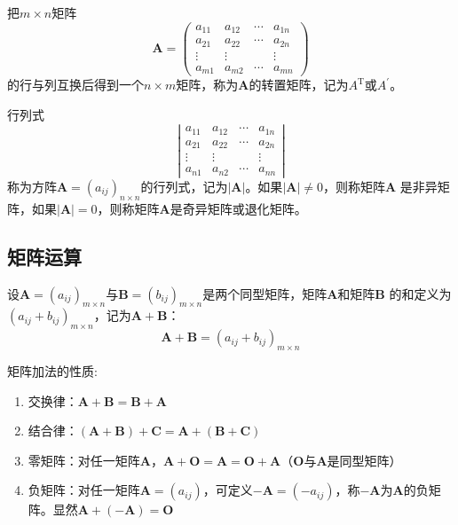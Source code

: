 \begin{definition}[转置矩阵]
    把$m\times n$矩阵
    $$
    \boldsymbol{A}=\left(\begin{array}{cccc}
    a_{11} & a_{12} & \cdots & a_{1 n} \\
    a_{21} & a_{22} & \cdots & a_{2 n} \\
    \vdots & \vdots & & \vdots \\
    a_{m 1} & a_{m 2} & \cdots & a_{m n}
    \end{array}\right)
    $$
    的行与列互换后得到一个$n\times m$矩阵，称为$\boldsymbol{A}$的{\heiti 转置矩阵}，记为$A^\mathrm{T}$或$A^{\prime}$。
\end{definition}

\begin{definition}[方阵的行列式]
    行列式
    $$
    \left|\begin{array}{cccc}
    a_{11} & a_{12} & \cdots & a_{1 n} \\
    a_{21} & a_{22} & \cdots & a_{2 n} \\
    \vdots & \vdots & & \vdots \\
    a_{n 1} & a_{n 2} & \cdots & a_{n n}
    \end{array}\right|
    $$
    称为方阵$\boldsymbol{A}=(a_{ij})_{n\times n}$的行列式，记为$|\boldsymbol{A}|$。如果$|\boldsymbol{A}|\neq 0$，则称矩阵$\boldsymbol{A}$
    是{\heiti 非异矩阵}，如果$|\boldsymbol{A}|=0$，则称矩阵$\boldsymbol{A}$是{\heiti 奇异矩阵}或{\heiti 退化矩阵}。
\end{definition}

\subsection{矩阵运算}
\begin{definition}[矩阵的加法]
    设$\boldsymbol{A}=(a_{ij})_{m\times n}$与$\boldsymbol{B}=(b_{ij})_{m\times n}$是两个同型矩阵，矩阵$\boldsymbol{A}$和矩阵$\boldsymbol{B}$
    的和定义为${(a_{ij}+b_{ij})}_{m\times n}$，记为$\boldsymbol{A}+\boldsymbol{B}$：
    $$\boldsymbol{A}+\boldsymbol{B}={(a_{ij}+b_{ij})}_{m\times n}$$
\end{definition}

\begin{theorem}
    矩阵加法的性质:
    \begin{enumerate}
        \item 交换律：$\boldsymbol{A}+\boldsymbol{B}=\boldsymbol{B}+\boldsymbol{A}$
        \item 结合律：$(\boldsymbol{A}+\boldsymbol{B})+\boldsymbol{C}=\boldsymbol{A}+(\boldsymbol{B}+\boldsymbol{C})$
        \item 零矩阵：对任一矩阵$\boldsymbol{A}$，$\boldsymbol{A}+\boldsymbol{O}=\boldsymbol{A}=\boldsymbol{O}+\boldsymbol{A}$（$\boldsymbol{O}$与$\boldsymbol{A}$是同型矩阵）
        \item 负矩阵：对任一矩阵$\boldsymbol{A}=(a_{ij})$，可定义$-\boldsymbol{A}=(-a_{ij})$，称$-\boldsymbol{A}$为$\boldsymbol{A}$的负矩阵。显然$\boldsymbol{A}+(-\boldsymbol{A})=\boldsymbol{O}$
    \end{enumerate}
\end{theorem}

